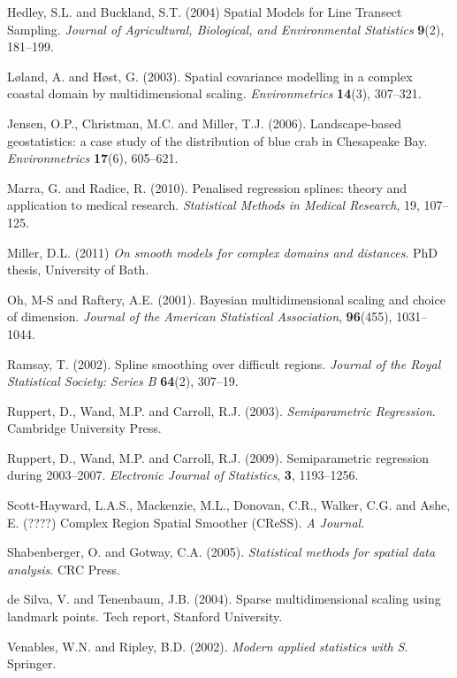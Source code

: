 \documentclass[useAMS, referee]{biom}
\begin{document}
\begin{thebibliography}{99}
\bibitem{ } Hedley, S.L. and Buckland, S.T. (2004) Spatial Models for Line Transect Sampling. \textit{Journal of Agricultural, Biological, and Environmental Statistics} \textbf{9}(2), 181--199.

\bibitem{} L{\o}land, A. and H{\o}st, G. (2003). Spatial covariance modelling in a complex coastal domain by multidimensional scaling. \textit{Environmetrics} \textbf{14}(3), 307--321.

\bibitem{} Jensen, O.P., Christman, M.C. and Miller, T.J. (2006). Landscape-based geostatistics: a case study of the distribution of blue crab in {C}hesapeake {B}ay. \textit{Environmetrics} \textbf{17}(6), 605--621.

\bibitem{} Marra, G. and Radice, R. (2010). Penalised regression splines: theory and application to medical research. \textit{Statistical Methods in Medical Research}, 19, 107--125.

\bibitem{} Miller, D.L. (2011) \textit{On smooth models for complex domains and distances}. PhD thesis, University of Bath.

\bibitem{} Oh, M-S and Raftery, A.E. (2001). Bayesian multidimensional scaling and choice of dimension. \textit{Journal of the American Statistical Association}, \textbf{96}(455), 1031--1044.

\bibitem{} Ramsay, T. (2002). Spline smoothing over difficult regions. \textit{Journal of the Royal Statistical Society: Series B} \textbf{64}(2), 307--19.

\bibitem{} Ruppert, D., Wand, M.P. and Carroll, R.J. (2003). \textit{Semiparametric Regression}. Cambridge University Press.

\bibitem{} Ruppert, D., Wand, M.P. and Carroll, R.J. (2009). Semiparametric regression during 2003--2007. \textit{Electronic Journal of Statistics}, \textbf{3}, 1193--1256.

\bibitem{} Scott-Hayward, L.A.S., Mackenzie, M.L., Donovan, C.R., Walker, C.G. and Ashe, E. (????) Complex Region Spatial Smoother (CReSS). \textit{A Journal}.

\bibitem{} Shabenberger, O. and Gotway, C.A. (2005). \textit{Statistical methods for spatial data analysis}. CRC Press.

\bibitem{} de Silva, V. and Tenenbaum, J.B. (2004). Sparse multidimensional scaling using landmark points. Tech report, Stanford University.

\bibitem{} Venables, W.N. and Ripley, B.D. (2002). \textit{Modern applied statistics with S}. Springer.


\end{thebibliography}
\end{document}
